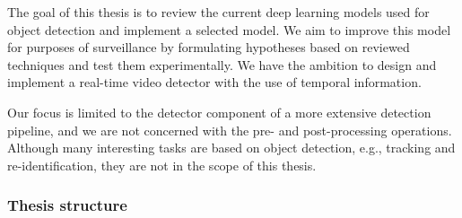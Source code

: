 The goal of this thesis is to review the current deep learning models used for object detection and implement a selected model. We aim to improve this model for purposes of surveillance by formulating hypotheses based on reviewed techniques and test them experimentally. We have the ambition to design and implement a real-time video detector with the use of temporal information.

Our focus is limited to the detector component of a more extensive detection pipeline, and we are not concerned with the pre- and post-processing operations.  Although many interesting tasks are based on object detection, e.g., tracking and re-identification,  they are not in the scope of this thesis.

\subsubsection{Thesis structure}
